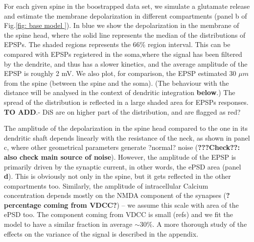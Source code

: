 \documentclass[10pt,letterpaper]{article}
\begin{document}
For each given spine in the boostrapped data set, we simulate a glutamate release and estimate the membrane depolarization in different compartments (panel b of Fig.\ref{fig: base model }). In blue we show the depolarization in the membrane of the spine head, where the solid line represents the median of the distributions of EPSPs. The shaded regions represents the 66\% region interval. This can be compared with EPSPs registered in the soma,where the signal has been filtered by the dendrite, and thus has a slower kinetics, and the average amplitude of the EPSP is roughly 2 mV. We also plot, for comparison, the EPSP estimated 30 $\mu m$ from the spine (between the spine and the soma). (The behaviour with the distance will be analysed in the context of dendritic integration {\bf below}.) The spread of the distribution is reflected in a large shaded area for EPSPs responses.
{\bf TO ADD}.- DiS are on higher part of the distribution, and are flagged as red?

The amplitude of the depolarization in the spine head compared to the one in its dendritic shaft depends linearly with the resistance of the neck, as shown in panel c, where other geometrical parameters generate ?normal? noise ({\bf ???Check??: also check main source of noise}). However, the amplitude of the EPSP is primarily driven by the synaptic current, in other words, the ePSD area (panel {\bf d}). This is obviously not only in the spine, but it  gets reflected in the other compartments too. 
Similarly, the amplitude of intracellular Calcium concentration depends mostly on the NMDA component of the synapses ({\bf ?percentage coming from VDCC?}) -- we assume this scale with area of the ePSD too. The component coming from VDCC is small (refs) and we fit the model to have a similar fraction in average $\sim 30\%$. A more thorough study of the effects on the variance of the signal is described in the appendix.




\end{document}
